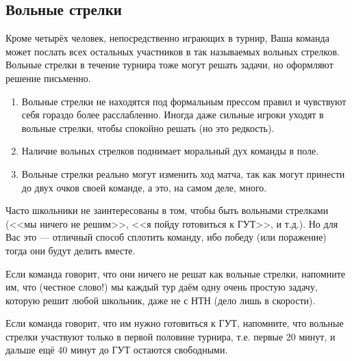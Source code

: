 \documentclass[12pt]{article}
\begin{document}
\subsection*{Вольные стрелки}
Кроме четырёх человек, непосредственно играющих в турнир, Ваша команда может послать всех остальных участников в так называемых вольных стрелков. Вольные стрелки в течение турнира тоже могут решать задачи, но оформляют решение письменно. 
\begin{enumerate}
	\item Вольные стрелки не находятся под формальным прессом правил и чувствуют себя гораздо более расслабленно. Иногда даже сильные игроки уходят в вольные стрелки, чтобы спокойно решать (но это редкость).
	\item Наличие вольных стрелков поднимает моральный дух команды в поле.
	\item Вольные стрелки реально могут изменить ход матча, так как могут принести до двух очков своей команде, а это, на самом деле, много.
\end{enumerate}

Часто школьники не заинтересованы в том, чтобы быть вольными стрелками (<<мы ничего не решим>>, <<я пойду готовиться к ГУТ>>, и т.д.). Но для Вас это --- отличный способ сплотить команду, ибо победу (или поражение) тогда они будут делить вместе.

Если команда говорит, что они ничего не решат как вольные стрелки, напомните им, что (честное слово!) мы каждый тур даём одну очень простую задачу, которую решит любой школьник, даже не с НТН (дело лишь в скорости). 

Если команда говорит, что им нужно готовиться к ГУТ, напомните, что вольные стрелки участвуют только в первой половине турнира, т.е. первые 20 минут, и дальше ещё 40 минут до ГУТ остаются свободными.
\end{document}
